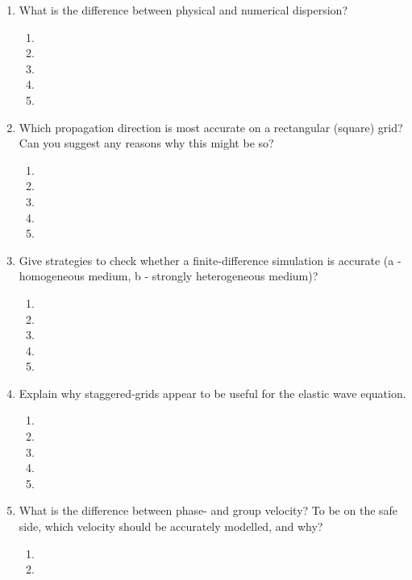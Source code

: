 \begin{enumerate}
\begin{enumerate}
\item[] 
\item[]
\item[] 
\end{enumerate}
\item What is the difference between physical and numerical dispersion?
\begin{enumerate}
\item[]
\item[]
\item[] 
\item[]
\item[] 
\end{enumerate}
\item Which propagation direction is most accurate on a rectangular (square) grid? Can you suggest any reasons why this might be so?
\begin{enumerate}
\item[]
\item[]
\item[] 
\item[]
\item[] 
\end{enumerate}
\item Give strategies to check whether a finite-difference simulation is accurate (a - homogeneous medium, b - strongly heterogeneous medium)? 
\begin{enumerate}
\item[]
\item[]
\item[] 
\item[]
\item[] 
\end{enumerate}
\item Explain why staggered-grids appear to be useful for the elastic wave equation. 
\begin{enumerate}
\item[]
\item[]
\item[] 
\item[]
\item[] 
\end{enumerate}
\item What is the difference between phase- and group velocity? To be on the safe side, which velocity should be accurately modelled, and why? 
\begin{enumerate}
\item[]
\item[]

\end{enumerate}
\end{enumerate}
